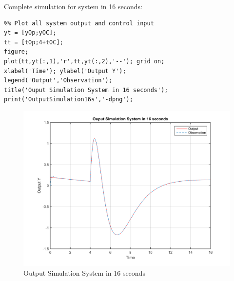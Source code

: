 \documentclass[14pt,a4paper]{article}
\begin{document}
	Complete simulation for system in 16 seconds:
\begin{lstlisting}
%% Plot all system output and control input
yt = [yOp;yOC];
tt = [tOp;4+tOC];
figure;
plot(tt,yt(:,1),'r',tt,yt(:,2),'--'); grid on;
xlabel('Time'); ylabel('Output Y');
legend('Output','Observation');
title('Ouput Simulation System in 16 seconds');
print('OutputSimulation16s','-dpng');
\end{lstlisting}
\begin{figure}[htp]
	\begin{center}
		\includegraphics[scale = 0.9]{OutputSimulation16s.png}
		\caption{Output Simulation System in 16 seconds}
	\end{center}
\end{figure}
\end{document}
